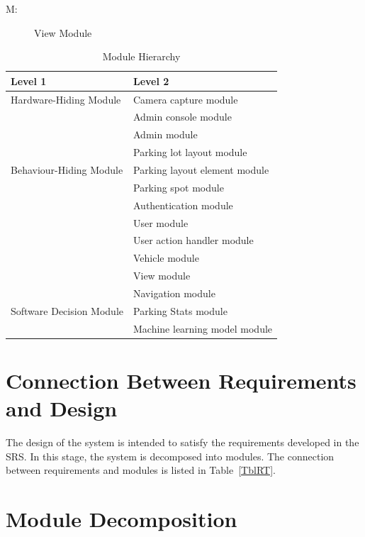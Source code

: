\documentclass[12pt, titlepage]{article}
\newcounter{mnum}
\newcommand{\mthemnum}{M\themnum}
\begin{document}
\begin{description}
\item [ \mthemnum \label{mView}:] View Module
\end{description}

\begin{table}[h!]
\centering
\begin{tabular}{p{} p{}}
\toprule
\textbf{Level 1} & \textbf{Level 2}\\
\midrule

{Hardware-Hiding Module} & Camera capture module \\
\midrule

\multirow{7}{0.3\textwidth}{Behaviour-Hiding Module} & Admin console module\\
& Admin module\\
& Parking lot layout module\\
& Parking layout element module\\
& Parking spot module\\
& Authentication module\\
& User module\\
& User action handler module\\
& Vehicle module\\
& View module\\
\midrule

\multirow{3}{0.3\textwidth}{Software Decision Module} & Navigation module\\
& Parking Stats module\\
& Machine learning model module\\
\bottomrule

\end{tabular}
\caption{Module Hierarchy}
\label{TblMH}
\end{table}

\section{Connection Between Requirements and Design} \label{SecConnection}

The design of the system is intended to satisfy the requirements developed in
the SRS. In this stage, the system is decomposed into modules. The connection
between requirements and modules is listed in Table~\ref{TblRT}.

\section{Module Decomposition} \label{SecMD}
\end{document}
